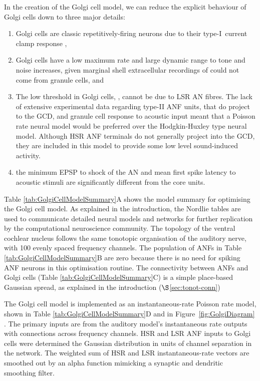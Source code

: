 In the creation of the Golgi cell model, we can reduce the explicit behaviour of
Golgi cells down to three major details:
\begin{enumerate}
\item Golgi cells are classic repetitively-firing neurons due to their
  type-I~current clamp response \citep{FerragamoGoldingEtAl:1998},
\item Golgi cells have a low maximum rate and large dynamic range to tone and
  noise increases, given marginal shell extracellular recordings of
  \citet{GhoshalKim:1997} could not come from granule cells, and
\item The low threshold in Golgi cells, \citet{GhoshalKim:1997}, cannot be due
  to LSR AN fibres. The lack of extensive experimental data regarding type-II
  ANF units, that do project to the GCD, and granule cell response to acoustic
  input meant that a Poisson rate neural model would be preferred over the
  Hodgkin-Huxley type neural model.  Although HSR ANF terminals do not generally
  project into the GCD, they are included in this model to provide some low
  level sound-induced activity.
\item the minimum EPSP to shock of the AN \citep{FerragamoGoldingEtAl:1998} and
  mean first spike latency to acoustic stimuli \citep{GhoshalKim:1997} are
  significantly different from the core \VCN units.
\end{enumerate}

Table \ref{tab:GolgiCellModelSummary}A shows the model summary for optimising
the Golgi cell model. As explained in the introduction, the Nordlie tables are
used to communicate detailed neural models and networks for further replication
by the computational neuroscience community. The topology of the ventral
cochlear nucleus follows the same tonotopic organisation of the auditory nerve,
with 100 evenly spaced frequency channels. The population of ANFs in Table
\ref{tab:GolgiCellModelSummary}B are zero because there is no need for spiking
ANF neurons in this optimisation routine.  The connectivity between ANFs and
Golgi cells (Table \ref{tab:GolgiCellModelSummary}C) is a simple place-based
Gaussian spread, as explained in the introduction ($\S$\ref{sec:tonot-conn})

 

The Golgi cell model is implemented as an instantaneous-rate Poisson rate model,
shown in Table \ref{tab:GolgiCellModelSummary}D and in
Figure~\ref{fig:GolgiDiagram} . The primary inputs are from the auditory model's
instantaneous rate outputs with connections across frequency channels. HSR and
LSR ANF inputs to Golgi cells were determined the Gaussian distribution in units
of channel separation in the network. The weighted sum of HSR and LSR
instantaneous-rate vectors are smoothed out by an alpha function mimicking a
synaptic and dendritic smoothing filter.

